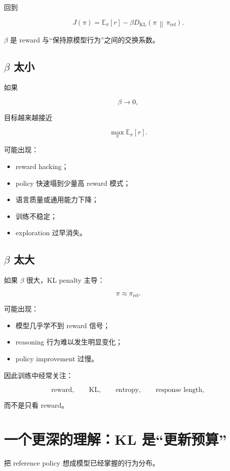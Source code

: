 \documentclass[11pt,a4paper]{ctexart}
\newcommand{\KL}[2]{D_{\mathrm{KL}}\!\left(#1\,\middle\|\,#2\right)}
\newcommand{\E}{\mathbb{E}}
\newcommand{\piref}{\pi_{\mathrm{ref}}}
\begin{document}
回到

\[
J(\pi)
=
\E_\pi[r]
-
\beta
\KL{\pi}{\piref}.
\]

$\beta$ 是 reward 与“保持原模型行为”之间的交换系数。

\subsection{$\beta$ 太小}

如果

\[
\beta\rightarrow0,
\]

目标越来越接近

\[
\max_\pi\E_\pi[r].
\]

可能出现：

\begin{itemize}
    \item reward hacking；
    \item policy 快速塌到少量高 reward 模式；
    \item 语言质量或通用能力下降；
    \item 训练不稳定；
    \item exploration 过早消失。
\end{itemize}

\subsection{$\beta$ 太大}

如果 $\beta$ 很大，KL penalty 主导：

\[
\pi\approx\piref.
\]

可能出现：

\begin{itemize}
    \item 模型几乎学不到 reward 信号；
    \item reasoning 行为难以发生明显变化；
    \item policy improvement 过慢。
\end{itemize}

因此训练中经常关注：

\[
\text{reward},
\qquad
\text{KL},
\qquad
\text{entropy},
\qquad
\text{response length},
\]

而不是只看 reward。

\section{一个更深的理解：KL 是“更新预算”}

把 reference policy 想成模型已经掌握的行为分布。
\end{document}
